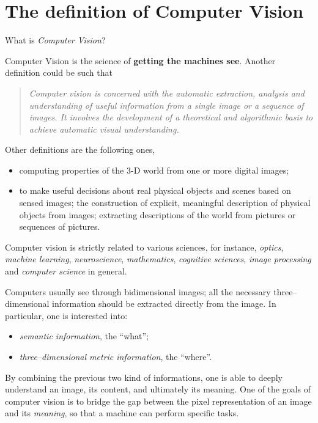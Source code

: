 \documentclass[10pt]{report}
\begin{document}
\section{The definition of Computer Vision}
\label{the-definition-of-computer-vision}
What is \emph{Computer Vision}?

Computer Vision is the science of \textbf{getting the machines see}. Another
definition could be such that

\begin{quote}
\emph{Computer vision is concerned with the automatic extraction, analysis and understanding of useful information from a single image or a sequence of images. It involves the development of a theoretical and algorithmic basis to achieve automatic visual understanding.}
\end{quote}

Other definitions are the following ones,

\begin{itemize}
\item computing properties of the 3-D world from one or more digital images;
\item to make useful decisions about real physical objects and scenes based
on sensed images; the construction of explicit, meaningful description
of physical objects from images; extracting descriptions of the world
from pictures or sequences of pictures.
\end{itemize}

Computer vision is strictly related to various sciences, for instance,
\emph{optics}, \emph{machine learning}, \emph{neuroscience}, \emph{mathematics}, \emph{cognitive
sciences}, \emph{image processing} and \emph{computer science} in general.

Computers usually see through bidimensional images; all the necessary
three--dimensional information should be extracted directly from the
image. In particular, one is interested into:

\begin{itemize}
\item \emph{semantic information}, the ``what'';
\item \emph{three--dimensional metric information}, the ``where''.
\end{itemize}

By combining the previous two kind of informations, one is able to
deeply understand an image, its content, and ultimately its meaning. One
of the goals of computer vision is to bridge the gap between the pixel
representation of an image and its \emph{meaning}, so that a machine can
perform specific tasks.
\end{document}
